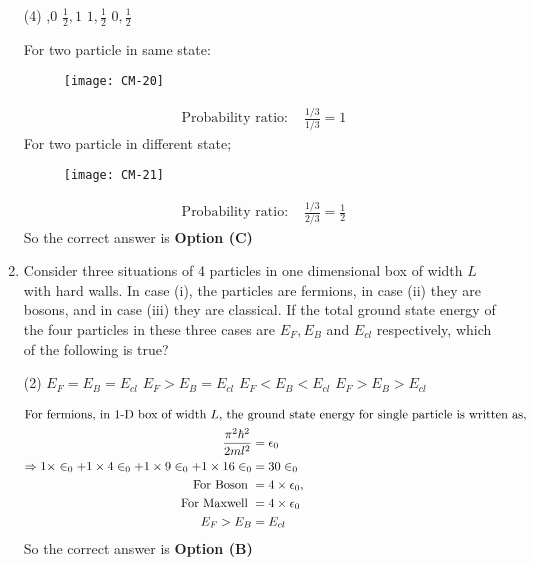 \begin{enumerate}
\begin{tasks}(4)
,0
\task[\textbf{B.}]  $\frac{1}{2}, 1$
\task[\textbf{C.}] $1, \frac{1}{2}$
\task[\textbf{D.}] $0, \frac{1}{2}$
\end{tasks}
\begin{answer}
For two particle in same state:\\
\begin{figure}[H]
	\centering
	\texttt{[image: CM-20]}
\end{figure}
\begin{align*}
\text{Probability ratio: }&\frac{1 / 3}{1 / 3}=1
\end{align*}
For two particle in different state;
\begin{figure}[H]
	\centering
	\texttt{[image: CM-21]}
\end{figure}
\begin{align*}
\text{Probability ratio: }&\frac{1 / 3}{2 / 3}=\frac{1}{2}
\end{align*}
So the correct answer is \textbf{Option (C)}
\end{answer}
	\item Consider three situations of 4 particles in one dimensional box of width $L$ with hard walls. In case (i), the particles are fermions, in case (ii) they are bosons, and in case (iii) they are classical. If the total ground state energy of the four particles in these three cases are $E_{F}, E_{B}$ and $E_{c l}$ respectively, which of the following is true?
\begin{tasks}(2)
\task[\textbf{A.}] $E_{F}=E_{B}=E_{c l}$
\task[\textbf{B.}] $E_{F}>E_{B}=E_{c l}$
\task[\textbf{C.}] $E_{F}<E_{B}<E_{c l}$
\task[\textbf{D.}] $E_{F}>E_{B}>E_{c l}$
\end{tasks}
\begin{answer}
\begin{align*}
\intertext{For fermions, in 1-D box of width $L$, the ground state energy for single particle is written as,}
\frac{\pi^{2} \hbar^{2}}{2 m l^{2}}&=\epsilon_{0}\\
\Rightarrow 1 \times \in_{0}+1 \times 4 \in_{0}+1 \times 9 \in_{0}+1 \times 16 \in_{0}&=30 \in_{0}\\
\text{ For Boson }&=4 \times \epsilon_{0},\\\text{ For Maxwell }&=4 \times \epsilon_{0}\\
E_{F}>E_{B}&=E_{c l}
\end{align*}
So the correct answer is \textbf{Option (B)}
\end{answer}

\end{enumerate}
